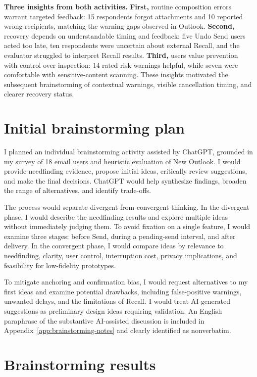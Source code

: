 \documentclass[letterpaper]{jdf}
\begin{document}
\textbf{Three insights from both activities.} \textbf{First,} routine composition errors warrant targeted feedback: 15 respondents forgot attachments and 10 reported wrong recipients, matching the warning gaps observed in Outlook. \textbf{Second,} recovery depends on understandable timing and feedback: five Undo Send users acted too late, ten respondents were uncertain about external Recall, and the evaluator struggled to interpret Recall results. \textbf{Third,} users value prevention with control over inspection: 14 rated risk warnings helpful, while seven were comfortable with sensitive-content scanning. These insights motivated the subsequent brainstorming of contextual warnings, visible cancellation timing, and clearer recovery status.

\section{Initial brainstorming plan}

I planned an individual brainstorming activity assisted by ChatGPT, grounded in my survey of 18 email users and heuristic evaluation of New Outlook. I would provide needfinding evidence, propose initial ideas, critically review suggestions, and make the final decisions. ChatGPT would help synthesize findings, broaden the range of alternatives, and identify trade-offs.

The process would separate divergent from convergent thinking. In the divergent phase, I would describe the needfinding results and explore multiple ideas without immediately judging them. To avoid fixation on a single feature, I would examine three stages: before Send, during a pending-send interval, and after delivery. In the convergent phase, I would compare ideas by relevance to needfinding, clarity, user control, interruption cost, privacy implications, and feasibility for low-fidelity prototypes.

To mitigate anchoring and confirmation bias, I would request alternatives to my first ideas and examine potential drawbacks, including false-positive warnings, unwanted delays, and the limitations of Recall. I would treat AI-generated suggestions as preliminary design ideas requiring validation. An English paraphrase of the substantive AI-assisted discussion is included in Appendix~\ref{app:brainstorming-notes} and clearly identified as nonverbatim.

\section{Brainstorming results}
\end{document}
